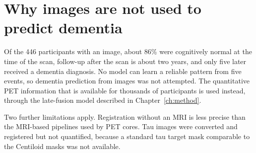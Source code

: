 \section{Why images are not used to predict dementia}
\label{sec:why_not_images}

Of the 446 participants with an image, about 86\% were cognitively normal at the time of the scan, follow-up after the scan is about two years, and only five later received a dementia diagnosis. No model can learn a reliable pattern from five events, so dementia prediction from images was not attempted. The quantitative PET information that is available for thousands of participants is used instead, through the late-fusion model described in Chapter~\ref{ch:method}.

Two further limitations apply. Registration without an MRI is less precise than the MRI-based pipelines used by PET cores. Tau images were converted and registered but not quantified, because a standard tau target mask comparable to the Centiloid masks was not available.
